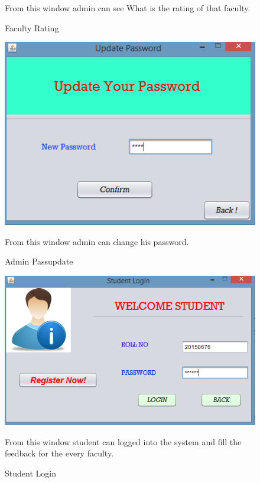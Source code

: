 \documentclass[12 pt,a4paper]{report}
\begin{document}
\begin{center}
\begin{figure}[ht]
\begin{center}
\caption{Faculty Rating}
\vspace{0.2 cm}
\justify
{From this window admin can see  What is the rating of that faculty.}
\end{center}
\end{figure}
\begin{figure}[ht]
\begin{center}
\includegraphics[scale=.7]{updatepass.png}\\
\caption{Admin Passupdate}
\vspace{0.2 cm}
\justify
{From this window admin can change his password.}
\end{center}
\end{figure}
\begin{figure}[ht]
\begin{center}
\includegraphics[scale=.7]{studlogin.png}\\
\caption{Student Login}
\vspace{0.2 cm}
\justify
{From this window student can logged into the system and fill the feedback for the every faculty.}\\

\end{center}
\end{figure}
\end{center}
\end{document}
